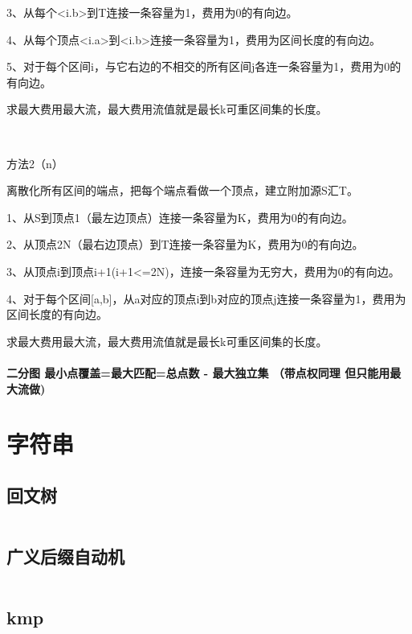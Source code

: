 \documentclass[a4paper,11pt]{article}
\begin{document}
   	3、从每个<i.b>到T连接一条容量为1，费用为0的有向边。
   	
   	4、从每个顶点<i.a>到<i.b>连接一条容量为1，费用为区间长度的有向边。
   	
   	5、对于每个区间i，与它右边的不相交的所有区间j各连一条容量为1，费用为0的有向边。
   	
   	求最大费用最大流，最大费用流值就是最长k可重区间集的长度。
   	
   	\
   	
   	方法2（n）
   	
   	
   	离散化所有区间的端点，把每个端点看做一个顶点，建立附加源S汇T。
   	
   	1、从S到顶点1（最左边顶点）连接一条容量为K，费用为0的有向边。
   	
   	2、从顶点2N（最右边顶点）到T连接一条容量为K，费用为0的有向边。
   	
   	3、从顶点i到顶点i+1(i+1<=2N)，连接一条容量为无穷大，费用为0的有向边。
   	
   	4、对于每个区间[a,b]，从a对应的顶点i到b对应的顶点j连接一条容量为1，费用为区间长度的有向边。
   	
   	求最大费用最大流，最大费用流值就是最长k可重区间集的长度。
   	
   \paragraph{二分图 最小点覆盖=最大匹配=总点数 - 最大独立集 （带点权同理 但只能用最大流做)}
   	






    \newpage
    \section{字符串}

    \subsection{回文树}
    \inputminted[breaklines]{c++}{String/pam.cpp}

    \subsection{广义后缀自动机}
    \inputminted[breaklines]{c++}{String/sam.cpp}

    \subsection{kmp}
    \inputminted[breaklines]{c++}{String/kmp.cpp}
\end{document}
